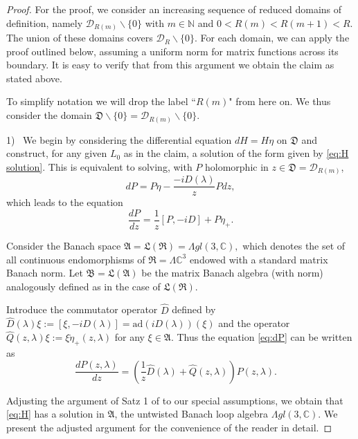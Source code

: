 \documentclass[a4paper,11pt]{amsart}
\theoremstyle{definition}
\numberwithin{equation}{section}
\newcommand{\C}{\mathbb{C}}
\begin{document}
 \begin{proof}  For the proof, we consider an increasing sequence of reduced domains of definition, namely   
  $\mathcal{D}_{R(m)} \backslash\{0\}$ with $m \in \mathbb{N}$ and $0 < R(m) < R(m+1) < R$. 
  The union of these domains covers 
 $\mathcal{D}_R\backslash\{0\}$. 
 For each domain, we can apply the proof outlined below, assuming a uniform norm for matrix functions across its boundary.
 It is easy to verify that from this argument we obtain the claim as stated above.
 
 To simplify notation we will drop the label  
``$R(m)$"  from here on. 
 We thus consider  the domain  $\mathfrak{D} \backslash\{0\} = \mathcal{D}_{R(m)}  \backslash\{0\}$. 
 
 1) \, We 
 begin by considering  the differential equation $dH=H\eta$  on $\mathfrak{D}$ and construct, for any given $L_0$ as in the claim, a solution of the form given by
 \eqref{eq:H solution}. 
This  is equivalent to solving, with $P$ holomorphic in $z \in  \mathfrak{D} = \mathcal{D}_{R(m)}$,
$$dP=P\eta-\frac{-iD(\lambda)}{z}Pdz,$$
which leads to the equation
\begin{equation}\label{eq:dP}
\frac{dP}{dz}=\frac{1}{z}[P,-iD]+P \mathring{\eta}_+.
\end{equation}

Consider the Banach space 
$\mathfrak{A} = \mathfrak{L} (\mathfrak{R})=\Lambda gl(3,\mathbb{C}),$
which denotes the set of all continuous endomorphisms of  $\mathfrak{R}=\Lambda{\C}^3$  endowed with a standard matrix Banach norm.
 Let  $ \mathfrak{B} = \mathfrak{L}(\mathfrak{A})$  be the matrix Banach algebra (with norm) 
  analogously defined  as in the case of $\mathfrak{L} (\mathfrak{R})$.
 
Introduce the commutator operator $\hat{D}$  defined by
$\hat{D}(\lambda)\xi:=[\xi,-iD(\lambda)] = \mathrm{ad} (i D(\lambda)) (\xi)$ and the operator
$\hat{Q}(z,\lambda)\xi:= \xi \mathring{\eta}_+(z,\lambda)$ for any $\xi\in \mathfrak{A}$. 
Thus the equation \eqref{eq:dP} can be written as
\begin{equation}\label{eq:P}
\frac{dP(z,\lambda)}{dz}=(\frac{1}{z}\hat{D}(\lambda)+\hat{Q}(z,\lambda))P(z,\lambda).\quad 
\end{equation}
 

Adjusting the argument of  Satz 1 of \cite{Sch-Sch} to our special assumptions,  
we obtain that \eqref{eq:H} has a 
solution in $\mathfrak{A}$, the untwisted Banach loop algebra $\Lambda gl(3,\mathbb{C})$.
 We present the adjusted argument for the convenience of the reader in detail.


\end{proof}
\end{document}
